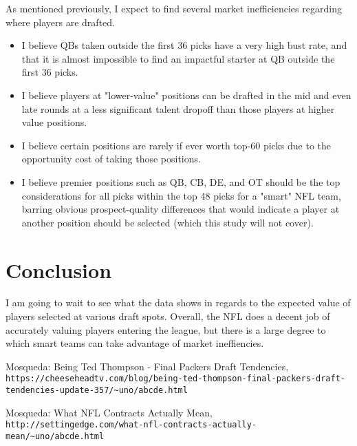 \documentclass{article}
\begin{document}
As mentioned previously, I expect to find several market inefficiencies regarding where players are drafted.
\begin{itemize}
    \item I believe QBs taken outside the first 36 picks have a very high bust rate, and that it is almost impossible to find an impactful starter at QB outside the first 36 picks. 
    \item I believe players at "lower-value" positions can be drafted in the mid and even late rounds at a less significant talent dropoff than those players at higher value positions.
    \item I believe certain positions are rarely if ever worth top-60 picks due to the opportunity cost of taking those positions.
    \item I believe premier positions such as QB, CB, DE, and OT should be the top considerations for all picks within the top 48 picks for a "smart" NFL team, barring obvious prospect-quality differences that would indicate a player at another position should be selected (which this study will not cover).
\end{itemize}

\section{Conclusion}

I am going to wait to see what the data shows in regards to the expected value of players selected at various draft spots. Overall, the NFL does a decent job of accurately valuing players entering the league, but there is a large degree to which smart teams can take advantage of market ineffiencies.


\begin{thebibliography}{2}

Mosqueda: Being Ted Thompson - Final Packers Draft Tendencies,
\\\texttt{https://cheeseheadtv.com/blog/being-ted-thompson-final-packers-draft-tendencies-update-357/\~{}uno/abcde.html}

Mosqueda: What NFL Contracts Actually Mean,
\\\texttt{http://settingedge.com/what-nfl-contracts-actually-mean/\~{}uno/abcde.html}


\end{thebibliography}
\end{document}
